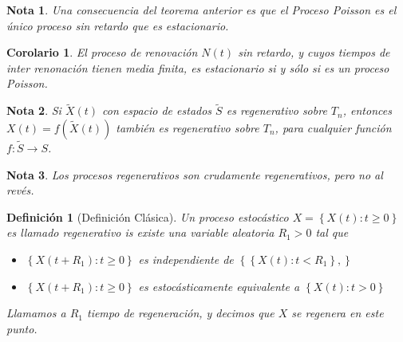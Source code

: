 \documentclass{article}
\newtheorem{Def}{Definición}
\newtheorem{Note}{Nota}
\newtheorem{Coro}{Corolario}
\begin{document}
\begin{Note}
Una consecuencia del teorema anterior es que el Proceso Poisson es el \'unico proceso sin retardo que es estacionario.
\end{Note}

\begin{Coro}
El proceso de renovaci\'on $N\left(t\right)$ sin retardo, y cuyos tiempos de inter renonaci\'on tienen media finita, es estacionario si y s\'olo si es un proceso Poisson.

\end{Coro}





\begin{Note}
Si $\tilde{X}\left(t\right)$ con espacio de estados $\tilde{S}$ es regenerativo sobre $T_{n}$, entonces $X\left(t\right)=f\left(\tilde{X}\left(t\right)\right)$ tambi\'en es regenerativo sobre $T_{n}$, para cualquier funci\'on $f:\tilde{S}\rightarrow S$.
\end{Note}

\begin{Note}
Los procesos regenerativos son crudamente regenerativos, pero no al rev\'es.
\end{Note}
\begin{Def}[Definici\'on Cl\'asica]
Un proceso estoc\'astico $X=\left\{X\left(t\right):t\geq0\right\}$ es llamado regenerativo is existe una variable aleatoria $R_{1}>0$ tal que
\begin{itemize}
\item[i)] $\left\{X\left(t+R_{1}\right):t\geq0\right\}$ es independiente de $\left\{\left\{X\left(t\right):t<R_{1}\right\},\right\}$
\item[ii)] $\left\{X\left(t+R_{1}\right):t\geq0\right\}$ es estoc\'asticamente equivalente a $\left\{X\left(t\right):t>0\right\}$
\end{itemize}

Llamamos a $R_{1}$ tiempo de regeneraci\'on, y decimos que $X$ se regenera en este punto.
\end{Def}
\end{document}
